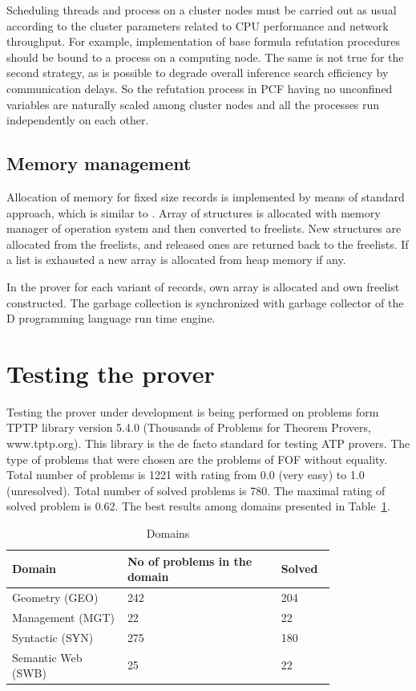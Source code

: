 \documentclass[runningheads,a4paper]{llncs}
\begin{document}
Scheduling threads and process on a cluster nodes must be carried out as usual according to the cluster parameters related to CPU performance and network throughput. For example, implementation of base formula refutation procedures should be bound to a process on a computing node. The same is not true for the second strategy, as is possible to degrade overall inference search efficiency by communication delays. So the refutation process in PCF having no unconfined variables are naturally scaled among cluster nodes and all the processes run independently on each other.

\subsection{Memory management}
Allocation of memory for fixed size records is implemented by means of standard approach, which is similar to \cite{gmemory}. Array of structures is allocated with memory manager of operation system and then converted to freelists. New structures are allocated from the freelists, and released ones are returned back to the freelists. If a list is exhausted a new array is allocated from heap memory if any.

In the prover for each variant of records, own array is allocated and own freelist constructed. The garbage collection is synchronized with garbage collector of the D programming language run time engine.


\section{Testing the prover}
Testing the prover under development is being performed on problems form TPTP \cite{tptp} library version 5.4.0 (Thousands of Problems for Theorem Provers, www.tptp.org). This library is the de facto standard for testing ATP provers. The type of problems that were chosen are the problems of FOF without equality. Total number of problems is 1221 with rating from 0.0 (very easy) to 1.0 (unresolved). Total number of solved problems is 780. The maximal rating of solved problem is 0.62. The best results among domains presented in Table~\ref{tbl:1}.

\begin{table}
\caption{Domains}\label{tbl:1}
\begin{tabular}{|p{0.3\linewidth}|p{0.4\linewidth}|p{0.1\linewidth}|}

\hline
\textbf{Domain} & \textbf{No of problems in the domain} & \textbf{Solved} \\
\hline
Geometry (GEO) & 242 & 204 \\
\hline
Management (MGT) & 22 & 22 \\
\hline
Syntactic  (SYN) & 275 & 180 \\
\hline
Semantic Web  (SWB) & 25 & 22 \\
\hline
\end{tabular}
\end{table}
\end{document}
